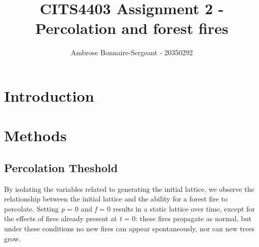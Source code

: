 \documentclass{article}
\title{CITS4403 Assignment 2 - Percolation and forest fires}
\author{Ambrose Bonnaire-Sergeant - 20350292}
\begin{document}
\maketitle
\pagebreak

\section{Introduction}






\section{Methods}

\subsection{Percolation Theshold}

By isolating the variables related to generating the initial lattice, we observe
the relationship between the initial lattice and the ability for a forest
fire to percolate. Setting \emph{p} = 0 and \emph{f} = 0 results in a static lattice
over time, except for the effects of fires already present at \emph{t} = 0:
these fires propagate as normal, but under these conditions
no new fires can appear spontaneously, nor can new trees grow.
\end{document}
